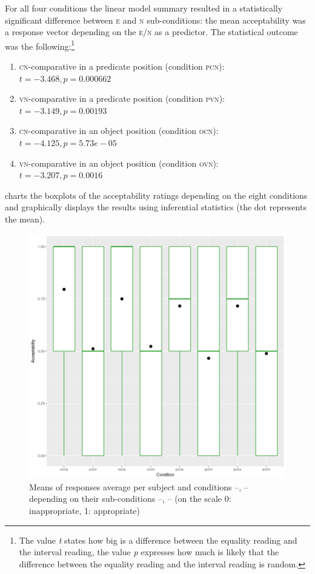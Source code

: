 \documentclass[output=paper,
]{langscibook}
\begin{document}
For all four conditions the linear model summary resulted in a statistically significant difference between \textsc{e} and \textsc{n} sub-conditions: the mean acceptability was a response vector depending on the \textsc{e/n} as a predictor. The statistical outcome was the following:\footnote{The value \textit{t} states how big is a difference between the equality reading and the interval reading, the value \textit{p} expresses how much is likely that the difference between the equality reading and the interval reading is random.}

\begin{enumerate}
\item \textsc{cn-}comparative in a predicate position (condition \textsc{pcn}):\\$t=-3.468,p=0.000662$
\item \textsc{vn-}comparative in a predicate position (condition \textsc{pvn}):\\$t=-3.149,p= 0.00193$
\item \textsc{cn-}comparative in an object position (condition \textsc{ocn}):\\$t=-4.125,p=5.73e-05$ 
\item \textsc{vn-}comparative in an object position (condition \textsc{ovn}):\\$t=-3.207,p=0.0016$
\end{enumerate}

\noindent {} charts the boxplots of the acceptability ratings depending on the eight conditions and graphically displays the results using inferential statistics (the dot represents the mean). 

\begin{figure}[t]
\includegraphics[width=1\linewidth]{figures/Rplot10.png} 
\centering
\caption{Means of responses average per subject and conditions --, -- depending on their sub-conditions --, -- (on the scale 0: inappropriate, 1: appropriate)}
\label{fig:graf}
\end{figure}
\end{document}
